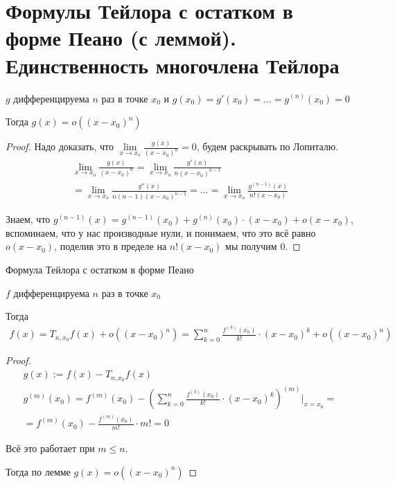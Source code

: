 
\section{Формулы Тейлора с остатком в форме Пеано (с леммой). Единственность многочлена Тейлора \href{https://youtu.be/au9-34CerJM?t=4684}{\Walley}}

\begin{lemma}
    
    $g$ дифференцируема $n$ раз в точке $x_0$ и $g(x_0) = g'(x_0) = \dots = g^{(n)}(x_0) = 0$

    Тогда $g(x) = o((x - x_0)^n)$

    \begin{proof}
        
        Надо доказать, что $\lim\limits_{x \to x_o} \frac{g(x)}{(x-x_0)^n} = 0$,
        будем раскрывать по Лопиталю.
        \begin{gather*}
            \lim\limits_{x \to x_o} \frac{g(x)}{(x-x_0)^n} = \lim\limits_{x \to x_o} \frac{g'(x)}{n(x-x_0)^{n-1}} \\ 
            = \lim\limits_{x \to x_o} \frac{g''(x)}{n(n-1)(x-x_0)^{n-2}} = \dots = \lim\limits_{x \to x_o} \frac{g^{(n-1)}(x)}{n!(x-x_0)}
        \end{gather*}

        Знаем, что $g^{(n-1)}(x) = g^{(n-1)}(x_0) + g^{(n)}(x_0) \cdot (x - x_0) + o(x - x_0)$, вспоминаем,
        что у нас производные нули, и понимаем, что это всё равно $o(x - x_0)$, поделив это в пределе на $n!(x-x_0)$ мы получим $0$.

    \end{proof}

\end{lemma}


\begin{theorem-non}
    Формула Тейлора с остатком в форме Пеано

    $f$ дифференцируема $n$ раз в точке $x_0$

    Тогда 
    \begin{gather*}
        f(x) = T_{n, x_0} f(x) + o((x - x_0)^n) = \sum_{k=0}^{n} \frac{f^{(k)}(x_0)}{k!} \cdot (x - x_0)^k + o((x - x_0)^n)
    \end{gather*}

    \begin{proof}

            \begin{gather*}
                g(x) := f(x) - T_{n, x_0} f(x) \\
                g^{(m)}(x_0) = f^{(m)}(x_0) - (\sum_{k = 0}^{n} \frac{f^{(k)}(x_0)}{k!} \cdot (x - x_0)^k)^{(m)} |_{x = x_0} = \\
                = f^{(m)}(x_0) - \frac{f^{(m)}(x_0)}{m!} \cdot m! = 0
            \end{gather*}

            Всё это работает при $m \leqslant n$.

            Тогда по лемме $g(x) = o((x - x_0)^n)$
    \end{proof}
\end{theorem-non}

